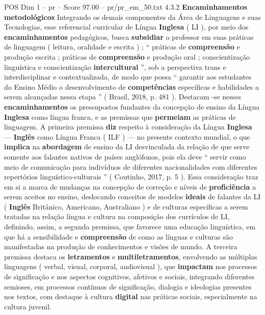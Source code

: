 \begin{textsample}{POS Dim 1 – pr – Score 97.00 – pr/pr\_em\_50.txt}  \label{ex:f1_pos_024}
4.3.2 \textbf{Encaminhamentos} \textbf{metodológicos} Integrando os demais componentes da Área de Linguagens e suas Tecnologias, esse referencial curricular de Língua \textbf{Inglesa} ( LI ), por meio dos \textbf{encaminhamentos} pedagógicos, busca \textbf{subsidiar} o professor em suas práticas de linguagem ( leitura, oralidade e escrita ) ; “ práticas de \textbf{compreensão} e produção escrita ; práticas de \textbf{compreensão} e produção oral ; conscientização linguística e conscientização \textbf{intercultural} ”, sob a perspectiva trans e interdisciplinar e contextualizada, de modo que possa “ garantir aos estudantes do Ensino Médio o desenvolvimento de \textbf{competências} específicas e habilidades a serem alcançadas nessa etapa ” ( Brasil, 2018, p. 481 ).
Destacam -se nesses \textbf{encaminhamentos} os pressupostos fundantes da concepção de ensino da Língua \textbf{Inglesa} como língua franca, e as premissas que \textbf{permeiam} as práticas de linguagem.
A primeira premissa \textbf{diz} respeito à consideração da Língua \textbf{Inglesa} — \textbf{Inglês} como Língua Franca ( ILF ) — no presente contexto mundial, o que \textbf{implica} na \textbf{abordagem} de ensino da LI desvinculada da relação de que serve somente aos falantes nativos de países anglófonos, pois ela deve “ servir como meio de comunicação para indivíduos de diferentes nacionalidades com diferentes repertórios linguístico-culturais ” ( Coutinho, 2017, p. 5 ).
Essa consideração traz em si a marca de mudanças na concepção de correção e níveis de \textbf{proficiência} a serem aceitos no ensino, deslocando conceitos de modelos \textbf{ideais} de falantes da LI ( \textbf{Inglês} Britânico, Americano, Australiano ) e de culturas específicas a serem tratadas na relação língua e cultura na composição dos currículos de LI, definindo, assim, a segunda premissa, que favorece uma educação linguística, em que há a sensibilidade e \textbf{compreensão} de como as línguas e culturas são manifestadas na produção de conhecimentos e visões de mundo.
A terceira premissa destaca os \textbf{letramentos} e \textbf{multiletramentos}, envolvendo as múltiplas linguagens ( verbal, visual, corporal, audiovisual ), que \textbf{impactam} nos processos de significação e nos aspectos cognitivos, afetivos e sociais, integrando diferentes semioses, em processos contínuos de significação, dialogia e ideologias presentes nos textos, com destaque à cultura \textbf{digital} nas práticas sociais, especialmente na cultura juvenil.

\end{textsample}
